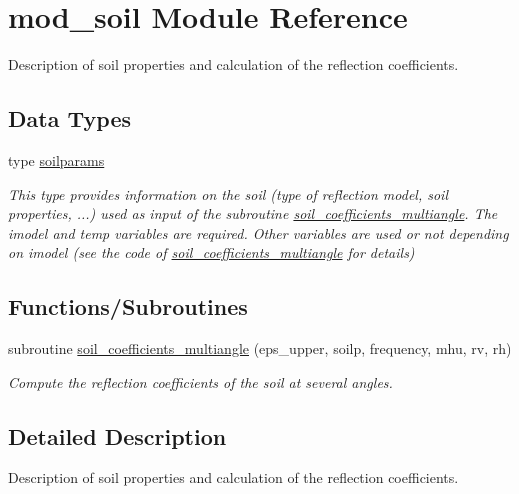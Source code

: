 \hypertarget{namespacemod__soil}{
\section{mod\_\-soil Module Reference}
\label{namespacemod__soil}
}


Description of soil properties and calculation of the reflection coefficients.  


\subsection*{Data Types}
\begin{DoxyCompactItemize}
\item 
type \hyperlink{typemod__soil_1_1soilparams}{soilparams}
\begin{DoxyCompactList}\small\item\em This type provides information on the soil (type of reflection model, soil properties, ...) used as input of the subroutine \hyperlink{namespacemod__soil_addfafc544d6649e3cf0bec775d55996e}{soil\_\-coefficients\_\-multiangle}. The imodel and temp variables are required. Other variables are used or not depending on imodel (see the code of \hyperlink{namespacemod__soil_addfafc544d6649e3cf0bec775d55996e}{soil\_\-coefficients\_\-multiangle} for details) \end{DoxyCompactList}\end{DoxyCompactItemize}
\subsection*{Functions/Subroutines}
\begin{DoxyCompactItemize}
\item 
subroutine \hyperlink{namespacemod__soil_addfafc544d6649e3cf0bec775d55996e}{soil\_\-coefficients\_\-multiangle} (eps\_\-upper, soilp, frequency, mhu, rv, rh)
\begin{DoxyCompactList}\small\item\em Compute the reflection coefficients of the soil at several angles. \end{DoxyCompactList}\end{DoxyCompactItemize}


\subsection{Detailed Description}
Description of soil properties and calculation of the reflection coefficients. 

